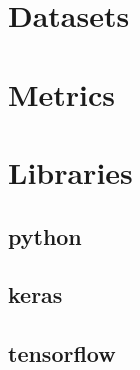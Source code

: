 \section{Datasets}
\section{Metrics}
\section{Libraries}
\subsection{python}
\subsection{keras}
\subsection{tensorflow}
